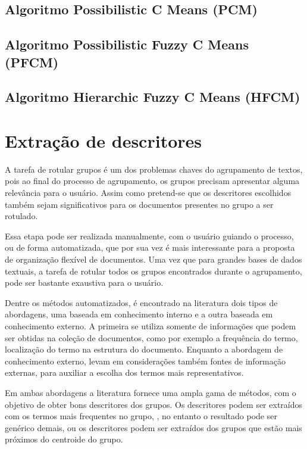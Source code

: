 \subsection{Algoritmo Possibilistic C Means (PCM)}
\subsection{Algoritmo Possibilistic Fuzzy C Means (PFCM)}
\subsection{Algoritmo Hierarchic Fuzzy C Means (HFCM)}

\section{Extração de descritores}

A tarefa de rotular grupos é um dos problemas chaves do agrupamento de textos, 
pois ao final do processo de agrupamento, os grupos precisam apresentar alguma relevância para 
o usuário\cite{Zhang2008}. Assim como pretend-se que os descritores escolhidos também sejam 
significativos para os documentos presentes no grupo a ser rotulado. 

Essa etapa pode ser realizada manualmente, com o usuário guiando o processo, ou de forma 
automatizada, que por sua vez é mais interessante para a proposta de organização flexível de 
documentos. Uma vez que para grandes bases de dados textuais, a tarefa de rotular todos os grupos
encontrados durante o agrupamento, pode ser bastante exaustiva para o usuário.

Dentre os métodos automatizados, é encontrado na literatura dois tipos de abordagens, uma 
baseada em conhecimento interno e a outra baseada em conhecimento externo\cite{Nogueira2013}. 
A primeira se utiliza somente de informações que podem ser obtidas na coleção de documentos, 
como por exemplo a frequência do termo, localização do termo na estrutura do documento.
Enquanto a abordagem de conhecimento externo, levam em considerações também fontes de informação
externas, para auxiliar a escolha dos termos mais representativos. 

Em ambas abordagens a literatura fornece uma ampla gama de métodos, com o objetivo de obter bons
descritores dos grupos. Os descritores podem ser extraídos com os termos mais frequentes no grupo,
, no entanto o resultado pode ser genérico demais\cite{Pucktada2006}, ou os descritores podem
ser extraídos dos grupos que estão mais próximos do centroide do grupo.

